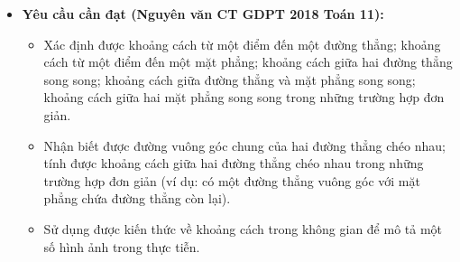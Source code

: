 \documentclass[12pt, a4paper]{article}
\begin{document}
\begin{itemize}[leftmargin=1.2cm]
    \item \textbf{Yêu cầu cần đạt (Nguyên văn CT GDPT 2018 Toán 11):}
    \begin{itemize}[leftmargin=0.6cm]
        \item Xác định được khoảng cách từ một điểm đến một đường thẳng; khoảng cách từ một điểm đến một mặt phẳng; khoảng cách giữa hai đường thẳng song song; khoảng cách giữa đường thẳng và mặt phẳng song song; khoảng cách giữa hai mặt phẳng song song trong những trường hợp đơn giản.
        \item Nhận biết được đường vuông góc chung của hai đường thẳng chéo nhau; tính được khoảng cách giữa hai đường thẳng chéo nhau trong những trường hợp đơn giản (ví dụ: có một đường thẳng vuông góc với mặt phẳng chứa đường thẳng còn lại).
        \item Sử dụng được kiến thức về khoảng cách trong không gian để mô tả một số hình ảnh trong thực tiễn.
    \end{itemize}


\end{itemize}
\end{document}
